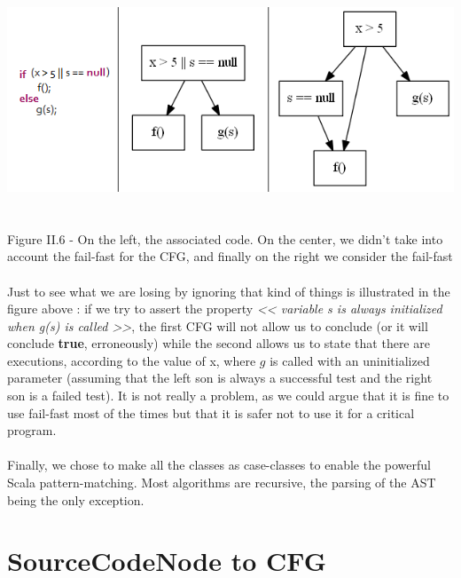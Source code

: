 \documentclass{report}
\begin{document}
\begin{center}
\includegraphics[scale=0.7]{data/fail-fast}
~\\~\\Figure II.6 - On the left, the associated code. On the center, we didn't take into account the fail-fast for the CFG, and finally on the right we consider the fail-fast
\end{center}

\paragraph{}
\hspace{4mm}Just to see what we are losing by ignoring that kind of things is illustrated in the figure above : if we try to
assert the property \textit {<< variable s is always initialized when g(s) is called >>}, the first CFG will not allow us to conclude
(or it will conclude \textbf {true}, erroneously) while the second allows us
to state that there are executions, according to the value of x,
where $g$ is called with an uninitialized parameter
(assuming that the left son is always a successful test and the right son is a failed test). It is not really a problem, as
we could argue that it is fine to use fail-fast most of the times but that it is safer not to use it for a critical program.

\paragraph{}
\hspace{4mm}Finally, we chose to make all the classes as case-classes to enable the powerful Scala pattern-matching.
Most algorithms are recursive, the parsing of the AST being the only exception.

\section{SourceCodeNode to CFG}
\end{document}
